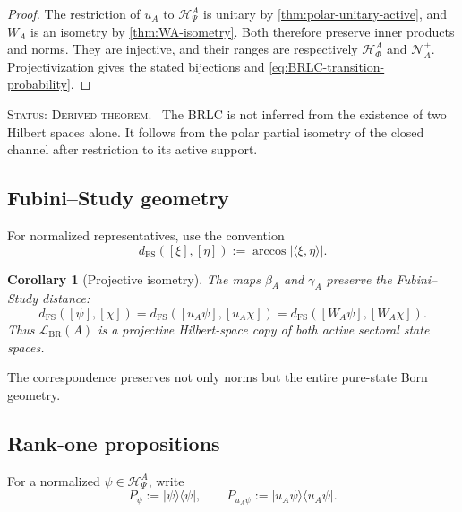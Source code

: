 \documentclass[11pt,reqno]{scrartcl}
\newcommand{\polA}{u_A}
\newcommand{\ket}[1]{\lvert #1\rangle}
\newcommand{\bra}[1]{\langle #1\rvert}
\newcommand{\inner}[2]{\langle #1,#2\rangle}
\newcommand{\statuslabel}[1]{\par\smallskip\noindent\textsc{Status: #1.}\ }
\newcommand{\actHP}{\mathscr H_{\Psi}^{A}}
\newcommand{\actHF}{\mathscr H_{\Phi}^{A}}
\newcommand{\NAplus}{\mathscr N_{A}^{+}}
\newcommand{\WA}{W_{A}}
\newcommand{\LBR}{\mathscr L_{\mathrm{BR}}(A)}
\theoremstyle{plain}
\newtheorem{corollary}[corollary]{Corollary}
\theoremstyle{definition}
\theoremstyle{remark}
\begin{document}
\begin{proof}
The restriction of \(\polA\) to \(\actHP\) is unitary by
\cref{thm:polar-unitary-active}, and \(\WA\) is an isometry by
\cref{thm:WA-isometry}.  Both therefore preserve inner products and norms.
They are injective, and their ranges are respectively \(\actHF\) and
\(\NAplus\).  Projectivization gives the stated bijections and
\eqref{eq:BRLC-transition-probability}.
\end{proof}

\statuslabel{Derived theorem} The BRLC is not inferred from the existence of
two Hilbert spaces alone.  It follows from the polar partial isometry of the
closed channel after restriction to its active support.

\subsection{Fubini--Study geometry}

For normalized representatives, use the convention
\begin{equation}
  d_{\mathrm{FS}}([\xi],[\eta])
  :=\arccos|\inner{\xi}{\eta}|.
  \label{eq:FS-distance-convention}
\end{equation}

\begin{corollary}[Projective isometry]
\label{cor:BRLC-FS-isometry}
The maps \(\beta_A\) and \(\gamma_A\) preserve the Fubini--Study distance:
\begin{equation}
  d_{\mathrm{FS}}([\psi],[\chi])
  =d_{\mathrm{FS}}([\polA\psi],[\polA\chi])
  =d_{\mathrm{FS}}([\WA\psi],[\WA\chi]).
  \label{eq:BRLC-FS-preservation}
\end{equation}
Thus \(\LBR\) is a projective Hilbert-space copy of both active sectoral
state spaces.
\end{corollary}

The correspondence preserves not only norms but the entire pure-state Born
geometry.

\subsection{Rank-one propositions}

For a normalized \(\psi\in\actHP\), write
\begin{equation}
  P_\psi:=\ket\psi\!\bra\psi,
  \qquad
  P_{\polA\psi}:=\ket{\polA\psi}\!\bra{\polA\psi}.
  \label{eq:rank-one-corresponding-projectors}
\end{equation}
\end{document}
